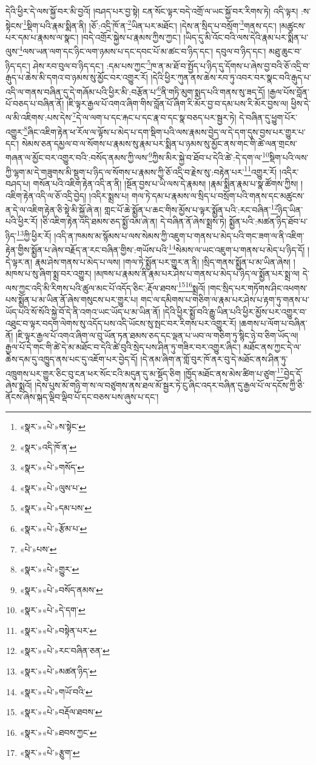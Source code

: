 དེའི་ཕྱིར་དེ་ལས་སྐྱོ་བར་མི་བྱའོ། །བཤད་པར་བྱ་སྟེ། ངན་སོང་ལྟར་བདེ་འགྲོ་ལ་ཡང་སྐྱོ་བར་རིགས་ཏེ། འདི་ལྟར། :ས་སྟེངས་\footnote{«སྣར་»«པེ་»ས་སྟེང་}སྡིག་པའི་རྣམ་སྨིན་ནི། །ཅོ་:འདྲི་ཁོ་ན་\footnote{«སྣར་»འདི་ཁོ་ན་}ཡིན་པར་མཐོང་། །དེས་ན་སྲིད་པ་བསྲོག་\footnote{«སྣར་»«པེ་»གསོད་}གནས་དང་། །མཚུངས་པར་དམ་པ་རྣམས་ལ་སྣང་། །བདེ་འགྲོར་སྐྱེས་པ་རྣམས་ཀྱིས་ཀྱང་། །ཡིད་དུ་མི་འོང་བའི་ལས་དེའི་རྣམ་པར་སྨིན་པ་ལུས་\footnote{«སྣར་»«པེ་»ལུས་པ་}ལས་ཡན་ལག་དང་ཉིང་ལག་ཉམས་པ་དང་དབང་པོ་མ་ཚང་བ་ཉིད་དང་། དབུལ་བ་ཉིད་དང་། མཐུ་ཆུང་བ་ཉིད་དང་། ཤེས་རབ་བུལ་བ་ཉིད་དང་། :དམ་པས་ཀྱང་\footnote{«སྣར་»«པེ་»དམ་པས་}ཁ་ན་མ་ཐོ་བ་སྤྱོད་པ་ཉིད་དུ་དོགས་པ་ཞེས་བྱ་བའི་ཅོ་འདྲི་བ་རྒུད་པ་ཆེས་མི་དགའ་བ་ཉམས་སུ་མྱོང་བར་འགྱུར་རོ། །དེའི་ཕྱིར་ཀུན་ནས་ཆེས་རབ་ཏུ་འབར་བར་སྣང་བའི་རྒུད་པ་འདི་ལ་གནས་བཞིན་དུ་དེ་གཞོམ་པའི་ཕྱིར་མི་:བརྩོན་པ་\footnote{«སྣར་»«པེ་»རྩོམ་པ་}ནི་གཏི་མུག་སྨད་པའི་གནས་སུ་ཟད་དོ། །རྒྱལ་པོས་བློན་པོ་བཅད་པ་བཞིན་ནོ། །ཇི་ལྟར་རྒྱལ་པོ་འགའ་ཞིག་གིས་བློན་པོ་ཞིག་རི་མོར་བྱ་བ་དམ་པས་རི་མོར་བྱས་ལ། ཕྱིས་དེ་ལ་མི་འཇིགས་:པས་དེས་\footnote{«པེ་»པས་}དེ་ལ་ལག་པ་དང་རྐང་པ་དང་རྣ་བ་དང་སྣ་བཅད་པར་སྦྱར་ཏེ། དེ་བཞིན་དུ་ཕྱུག་པོར་འགྱུར་\footnote{«སྣར་»«པེ་»གྱུར་}ཞིང་འཇིག་རྟེན་ཕ་རོལ་ལ་ལྟོས་པ་མེད་པ་དག་སྡིག་པའི་ལས་རྣམས་བྱེད་ལ་དེ་དག་དུས་བྱས་པར་གྱུར་པ་དང་། སེམས་ཅན་དམྱལ་བ་ལ་སོགས་པ་རྣམས་སུ་རྣམ་པར་སྨིན་པ་ཉམས་སུ་མྱོང་ནས་གང་གི་ཚེ་ལན་གྲངས་གཞན་ལ་མྱོང་བར་འགྱུར་བའི་:བསོད་ནམས་ཀྱི་ལས་\footnote{«སྣར་»«པེ་»བསོད་ནམས་}ཀྱིས་མིར་སྐྱེ་བ་ཐོབ་པ་དེའི་ཚེ་:དེ་དག་ལ་\footnote{«སྣར་»«པེ་»དེ་དག་}སྡིག་པའི་ལས་ཀྱི་ལྷག་མ་དེ་གཟུགས་མི་སྡུག་པ་ཉིད་ལ་སོགས་པ་རྣམས་ཀྱི་ཅོ་འདྲི་བ་རྗེས་སུ་:བརྟེན་པར་\footnote{«སྣར་»«པེ་»བསྟེན་པར་}འགྱུར་རོ། །འདིར་བཤད་པ། གསོན་པའི་འཇིག་རྟེན་འདི་ན་ནི། །སྔོན་བྱས་པ་ཡི་ལས་དེ་རྣམས། །རྣམ་སྨིན་རྣམ་པ་སྣ་ཚོགས་ཀྱིས། །འཇིག་རྟེན་འདི་ལ་ཅོ་འདྲི་བྱེད། །འདིར་སྨྲས་པ། གལ་ཏེ་དམ་པ་རྣམས་ལ་སྲིད་པ་བསྲོག་པའི་གནས་དང་མཚུངས་ན་དེ་ལ་འཇིག་རྟེན་ཅི་སྟེ་མི་སྐྱོ་ཞེ་ན། གླང་པོ་ཆེ་སྨྱོན་པ་ཆང་གིས་མྱོས་པ་ལྟར་སྨྱོན་པའི་:རང་བཞིན་\footnote{«སྣར་»«པེ་»རང་བཞིན་ཅན་}ཉིད་ཡིན་པའི་ཕྱིར་རོ། །ཅི་འཇིག་རྟེན་འདི་ཐམས་ཅད་སྨྱོ་འམ་ཞེ་ན། དེ་བཞིན་ནོ་ཞེས་སྨྲས་ཏེ། སྨྱོན་པའི་:མཚན་ཉིད་ཐོབ་པ་ཉིད་\footnote{«སྣར་»«པེ་»མཚན་ཉིད་}ཀྱི་ཕྱིར་རོ། །འདི་ན་ཁམས་མ་སྙོམས་པ་ལས་སེམས་ཀྱི་འཇུག་པ་གནས་པ་མེད་པའི་གང་ཟག་ལ་ནི་འཇིག་རྟེན་གྱིས་སྨྱོན་པ་ཞེས་བརྗོད་ན་རང་བཞིན་གྱིས་:གཡོས་པའི་\footnote{«སྣར་»«པེ་»གཡོ་བའི་}སེམས་ལ་ཡང་འཇུག་པ་གནས་པ་མེད་པ་ཉིད་དོ། །དེ་ལྟར་ན། རྣམ་ཤེས་གནས་པ་མེད་པ་ལས། །གལ་ཏེ་སྨྱོན་པར་གྱུར་ན་ནི། །སྲིད་གནས་སྨྱོན་པ་མ་ཡིན་ཞེས། །མཁས་པ་སུ་ཞིག་སྨྲ་བར་འགྱུར། །མཁས་པ་རྣམས་ནི་རྣམ་པར་ཤེས་པ་གནས་པ་མེད་པ་ཉིད་ལ་སྨྱོན་པར་སྨྲ་ལ། དེ་ལས་ཀྱང་འདི་མི་རིགས་པའི་ཚུལ་མང་པོ་འདོད་ཅིང་:རྡོལ་ཐབས་\footnote{«སྣར་»«པེ་»བརྡོལ་ཐབས་}\footnote{«སྣར་»«པེ་»ཐབས་ཀྱང་}སྨྲའོ། །གང་སྲིད་པར་གཏོགས་ཤིང་འཕགས་པས་སྨྱོན་པ་མ་ཡིན་ནོ་ཞེས་གསུངས་པར་གྱུར་པ། གང་ལ་དམིགས་པ་གཅིག་ལ་རྣམ་པར་ཤེས་པ་རྟག་ཏུ་གནས་པ་ཡོད་པའི་སོ་སོའི་སྐྱེ་བོ་དེ་ནི་འགའ་ཡང་ཡོད་པ་མ་ཡིན་ནོ། །དེའི་ཕྱིར་སྨྱོ་བའི་རྒྱུ་ཡིན་པའི་ཕྱིར་མྱོས་པར་འགྱུར་བ་འཐུང་བ་ལྟར་བདག་ལེགས་སུ་འདོད་པས་འདི་ཡོངས་སུ་སྤང་བར་རིགས་པར་འགྱུར་རོ། །ཆགས་པ་ལོག་པ་བཞིན་ནོ། །ཇི་ལྟར་རྒྱལ་པོ་འགའ་ཞིག་ལ་བུ་ཡོན་ཏན་ཐམས་ཅད་དང་ལྡན་པ་ཡབ་ལ་གཅིག་ཏུ་སྙིང་ཉེ་བ་ཅིག་ཡོད་ལ། རྒྱལ་པོ་དེ་གང་གི་ཚེ་དེ་མ་མཐོང་བ་དེའི་ཚེ་བུའི་སྲེད་པས་ཤིན་ཏུ་གཟིར་བར་འགྱུར་ཞིང་། མཐོང་ནས་ཀྱང་དེ་ལ་ཆེས་དམ་དུ་འཁྱུད་ནས་པང་དུ་འཇོག་པར་བྱེད་དོ། །དེ་ནམ་ཞིག་ན་གློ་བུར་ཁོ་ནར་བུ་དེ་མཐོང་ནས་ཤིན་ཏུ་འཁྲུགས་པར་གྱུར་ཅིང་བུ་ངན་ཕར་སོང་ངའི་མདུན་དུ་མ་སྡོད་ཅིག །ཁྱོད་མཐོང་ནས་མེས་ཚིག་པ་ཙུག་\footnote{«སྣར་»«པེ་»རྩུག་}བྱེད་དོ་ཞེས་སྨྲའོ། །དེས་པུས་མོ་གཉི་ག་ས་ལ་བཙུགས་ནས་ཐལ་མོ་སྦྱར་ཏེ་ངུ་ཞིང་འདར་བཞིན་དུ་རྒྱལ་པོ་ལ་དངོས་ཀྱི་ཅི་ནོངས་ཞེས་སྐད་ལྡིབ་ལྡིབ་པོ་དང་བཅས་པས་ཞུས་པ་དང་། 
